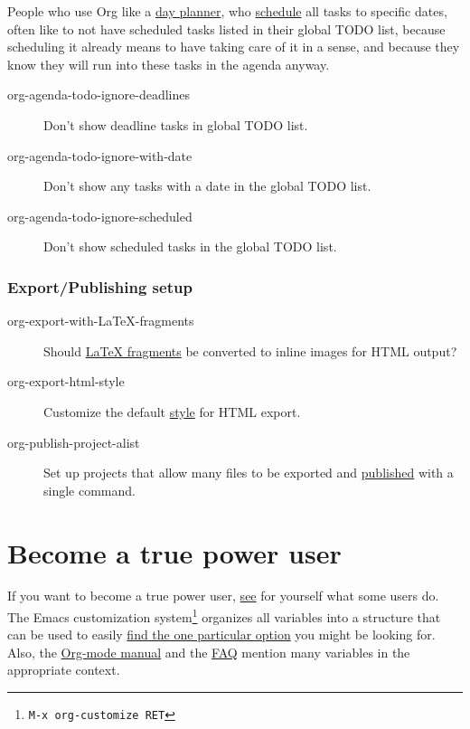 \documentclass[11pt]{article}
\begin{document}
People who use Org like a \href{http://www.newartisans.com/2007/08/using-org-mode-as-a-day-planner.html}{day planner}, who \href{http://orgmode.org/manual/Deadlines-and-scheduling.html\#Deadlines-and-scheduling}{schedule} all tasks to
specific dates, often like to not have scheduled tasks listed in their
global TODO list, because scheduling it already means to have taking
care of it in a sense, and because they know they will run into these
tasks in the agenda anyway.

\begin{description}
\item[{org-agenda-todo-ignore-deadlines}] Don't show deadline tasks in
global TODO list.

\item[{org-agenda-todo-ignore-with-date}] Don't show any tasks with a date
in the global TODO list.

\item[{org-agenda-todo-ignore-scheduled}] Don't show scheduled tasks
in the global TODO list.
\end{description}

\subsubsection*{Export/Publishing setup}
\label{sec:org85c5974}


\begin{description}
\item[{org-export-with-\LaTeX{}-fragments}] Should \href{http://orgmode.org/manual/LaTeX-fragments.html\#LaTeX-fragments}{\LaTeX{} fragments} be
converted to inline images for HTML output?

\item[{org-export-html-style}] Customize the default \href{http://orgmode.org/manual/CSS-support.html\#CSS-support}{style} for HTML
export.

\item[{org-publish-project-alist}] Set up projects that allow many files
to be exported and \href{http://orgmode.org/manual/Publishing.html\#Publishing}{published} with a single command.
\end{description}

\section*{Become a true power user}
\label{sec:orgf1107c0}

If you want to become a true power user, \href{http://thread.gmane.org/gmane.emacs.orgmode/10804}{see} for yourself what some users
do.  The Emacs customization system\footnote{\texttt{M-x org-customize RET}} organizes
all variables into a structure that can be used to easily \href{http://orgmode.org/worg/org-tutorials/org-customize.html}{find the one
particular option} you might be looking for.  Also, the \href{http://orgmode.org/manual/}{Org-mode manual} and
the \href{http://orgmode.org/worg/org-faq.html}{FAQ} mention many variables in the appropriate context.
\end{document}
